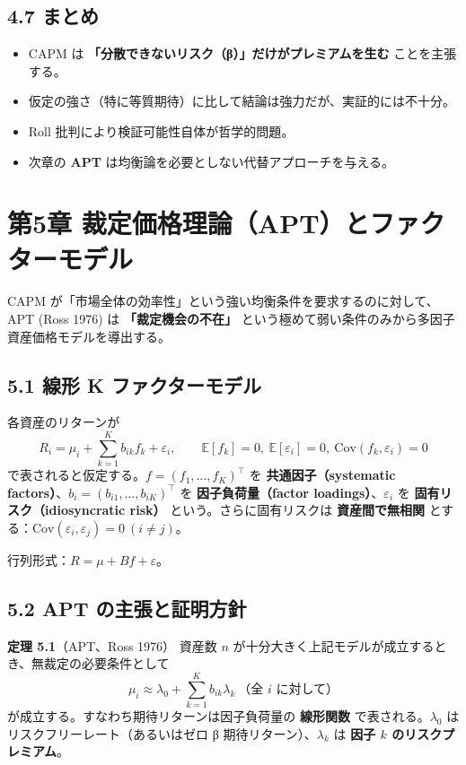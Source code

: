 \documentclass[11pt,a4paper]{report}
\begin{document}
\section{4.7 まとめ}

\begin{itemize}
\item CAPM は \textbf{「分散できないリスク（β）」だけがプレミアムを生む} ことを主張する。
\item 仮定の強さ（特に等質期待）に比して結論は強力だが、実証的には不十分。
\item Roll 批判により検証可能性自体が哲学的問題。
\item 次章の \textbf{APT} は均衡論を必要としない代替アプローチを与える。
\end{itemize}

\noindent\hrulefill

\chapter{第5章 裁定価格理論（APT）とファクターモデル}

CAPM が「市場全体の効率性」という強い均衡条件を要求するのに対して、APT (Ross 1976) は \textbf{「裁定機会の不在」} という極めて弱い条件のみから多因子資産価格モデルを導出する。

\section{5.1 線形 K ファクターモデル}

各資産のリターンが \[ R_i = \mu_i + \sum_{k=1}^K b_{ik} f_k + \varepsilon_i, \qquad \mathbb{E}[f_k] = 0,\ \mathbb{E}[\varepsilon_i] = 0,\ \mathrm{Cov}(f_k, \varepsilon_i) = 0 \] で表されると仮定する。$f = (f_1, \dots, f_K)^\top$ を \textbf{共通因子（systematic factors）}、$b_i = (b_{i1}, \dots, b_{iK})^\top$ を \textbf{因子負荷量（factor loadings）}、$\varepsilon_i$ を \textbf{固有リスク（idiosyncratic risk）} という。さらに固有リスクは \textbf{資産間で無相関} とする：$\mathrm{Cov}(\varepsilon_i, \varepsilon_j) = 0\ (i \neq j)$。

行列形式：$R = \mu + B f + \varepsilon$。

\section{5.2 APT の主張と証明方針}

\textbf{定理 5.1}（APT、Ross 1976） 資産数 $n$ が十分大きく上記モデルが成立するとき、無裁定の必要条件として \[ \boxed{\; \mu_i \approx \lambda_0 + \sum_{k=1}^K b_{ik} \lambda_k\ \text{（全 } i \text{ に対して）} \;} \] が成立する。すなわち期待リターンは因子負荷量の \textbf{線形関数} で表される。$\lambda_0$ はリスクフリーレート（あるいはゼロ β 期待リターン）、$\lambda_k$ は \textbf{因子 $k$ のリスクプレミアム}。
\end{document}
